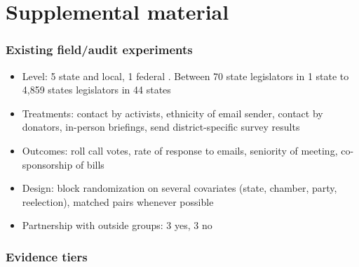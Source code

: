 \documentclass[usenames,dvipsnames]{beamer}
\begin{document}
\appendix

\section{Supplemental material}


\begin{frame}[label= existing]
\frametitle{Existing field/audit experiments}
\label{tab:audit_experiments} 
\begin{itemize}
	\item \textcolor{Cerulean}{Level}: 5 state and local, 1 federal \citep{kalla2016campaign}. Between 70 state legislators in 1 state to 4,859 states legislators in 44 states \citep{butler2011politicians}
	\item \textcolor{Cerulean}{Treatments}: contact by activists, ethnicity of email sender, contact by donators, in-person briefings, send district-specific survey results
	\item \textcolor{Cerulean}{Outcomes}:  roll call votes, rate of response to emails, seniority of meeting, co-sponsorship of bills
	\item \textcolor{Cerulean}{Design}: block randomization on several covariates (state, chamber, party, reelection), matched pairs whenever possible
	\item \textcolor{Cerulean}{Partnership with outside groups}: 3 yes, 3 no
\end{itemize}
\end{frame}


\begin{frame}[label= doe_evidence]
\frametitle{Evidence tiers}


\end{frame}
\end{document}
